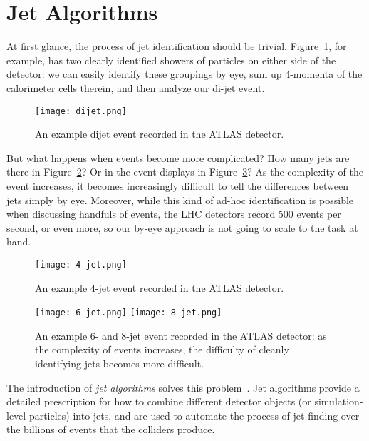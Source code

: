 \section{Jet Algorithms}

At first glance, the process of jet identification should be trivial. Figure~\ref{fig:jets:dijet}, for example, has two clearly identified showers of particles on either side of the detector: we can easily identify these groupings by eye, sum up 4-momenta of the calorimeter cells therein, and then analyze our di-jet event.



\begin{figure}
\centering
\texttt{[image: dijet.png]}
\label{fig:jets:dijet}
\caption{An example dijet event recorded in the ATLAS detector.}
\end{figure}


But what happens when events become more complicated? How many jets are there in Figure~\ref{fig:jets:4-jet}? Or in the event displays in Figure~\ref{fig:jets:many-jet}? As the complexity of the event increases, it becomes increasingly difficult to tell the differences between jets simply by eye. Moreover, while this kind of ad-hoc identification is possible when discussing handfuls of events, the LHC detectors record 500 events per second, or even more, so our by-eye approach is not going to scale to the task at hand. 


\begin{figure}
\centering
\texttt{[image: 4-jet.png]}
\label{fig:jets:4-jet}
\caption{An example 4-jet event recorded in the ATLAS detector.}
\end{figure}




\begin{figure}
\centering
\texttt{[image: 6-jet.png]}
\texttt{[image: 8-jet.png]}
\label{fig:jets:many-jet}
\caption{An example 6- and 8-jet event recorded in the ATLAS detector: as the complexity of events increases, the difficulty of cleanly identifying jets becomes more difficult.}
\end{figure}



The introduction of \textit{jet algorithms} solves this problem~\cite{Jetography}. Jet algorithms provide a detailed prescription for how to combine different detector objects (or simulation-level particles) into jets, and are used to automate the process of jet finding over the billions of events that the colliders produce.

